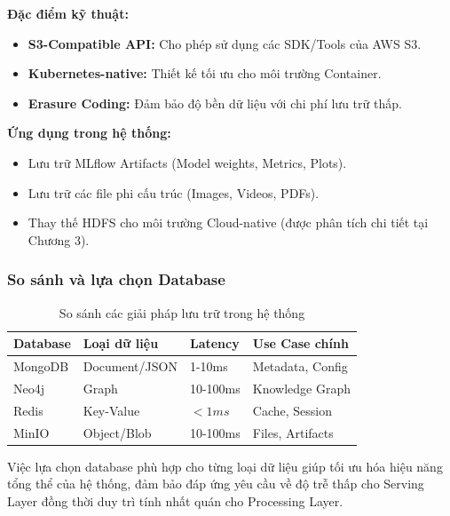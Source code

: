 \textbf{Đặc điểm kỹ thuật:}
\begin{itemize}
    \item \textbf{S3-Compatible API:} Cho phép sử dụng các SDK/Tools của AWS S3.
    \item \textbf{Kubernetes-native:} Thiết kế tối ưu cho môi trường Container.
    \item \textbf{Erasure Coding:} Đảm bảo độ bền dữ liệu với chi phí lưu trữ thấp.
\end{itemize}

\textbf{Ứng dụng trong hệ thống:}
\begin{itemize}
    \item Lưu trữ MLflow Artifacts (Model weights, Metrics, Plots).
    \item Lưu trữ các file phi cấu trúc (Images, Videos, PDFs).
    \item Thay thế HDFS cho môi trường Cloud-native (được phân tích chi tiết tại Chương 3).
\end{itemize}

\subsubsection{So sánh và lựa chọn Database}

\begin{table}[H]
\centering
\caption{So sánh các giải pháp lưu trữ trong hệ thống}
\label{tab:database-comparison}
\begin{tabular}{|l|l|l|l|}
\hline
\textbf{Database} & \textbf{Loại dữ liệu} & \textbf{Latency} & \textbf{Use Case chính} \\
\hline
MongoDB & Document/JSON & 1-10ms & Metadata, Config \\
\hline
Neo4j & Graph & 10-100ms & Knowledge Graph \\
\hline
Redis & Key-Value & $<1ms$ & Cache, Session \\
\hline
MinIO & Object/Blob & 10-100ms & Files, Artifacts \\
\hline
\end{tabular}
\end{table}

Việc lựa chọn database phù hợp cho từng loại dữ liệu giúp tối ưu hóa hiệu năng tổng thể của hệ thống, đảm bảo đáp ứng yêu cầu về độ trễ thấp cho Serving Layer đồng thời duy trì tính nhất quán cho Processing Layer.
